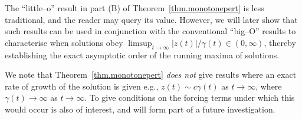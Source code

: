 \documentclass[a4paper,10pt,reqno]{amsart}
\numberwithin{equation}{section}
\theoremstyle{definition}
\theoremstyle{remark}
\DeclareMathOperator{\1}{\mathbbm 1}
\begin{document}
	The ``little--o'' result in part (B) of Theorem~\ref{thm.monotonepert} is less traditional, and the reader may query its  value. However, we will later show that such results can be used in conjunction with the conventional ``big--O'' results to characterise when solutions obey $\limsup_{t\to\infty}|z(t)|/\gamma(t)\in (0,\infty)$, thereby establishing the exact asymptotic order of the running maxima of solutions.  
	
	We note that Theorem~\ref{thm.monotonepert} \textit{does not} give results where an exact rate of growth of the solution is given e.g., $z(t)\sim c\gamma(t)$ as $t\to\infty$, where $\gamma(t)\to \infty$ as $t\to\infty$. To give conditions on the forcing terms under which this would occur is also of interest, and will form part of a future investigation.    
	
	
\end{document}
